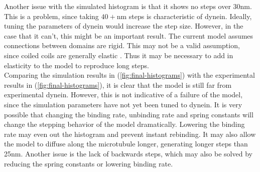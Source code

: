 \documentclass[
11pt, %
english, %
singlespacing, %
headsepline, %
chapterinoneline, %
]{MastersDoctoralThesis} %
\begin{document}
Another issue with the simulated histogram is that it shows no steps over $30$nm. This is a problem, since taking $40+$nm steps is characteristic of dynein. Ideally, tuning the parameters of dynein would increase the step size. However, in the case that it can't, this might be an important result. The current model assumes connections between domains are rigid. This may not be a valid assumption, since coiled coils are generally elastic \cite{myosin-cc-elasticity}. Thus it may be necessary to add in elasticity to the model to reproduce long steps.\\

Comparing the simulation results in (\ref{fig:final-histograms}) with the experimental results in (\ref{fig:final-histograms}), it is clear that the model is still far from experimental dynein. However, this is not indicative of a failure of the model, since the simulation parameters have not yet been tuned to dynein. It is very possible that changing the binding rate, unbinding rate and spring constants will change the stepping behavior of the model dramatically. Lowering the binding rate may even out the histogram and prevent instant rebinding. It may also allow the model to diffuse along the microtubule longer, generating longer steps than 25nm. Another issue is the lack of backwards steps, which may also be solved by reducing the spring constants or lowering binding rate.\\


\end{document}

